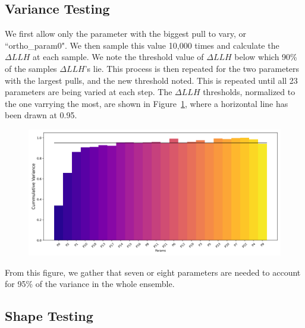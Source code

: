 \documentclass[12pt,a4paper]{article}
\begin{document}
\subsection{Variance Testing}

We first allow only the parameter with the biggest pull to vary, or ``ortho\_param0". 
We then sample this value 10,000 times and calculate the $\Delta LLH$ at each sample. 
We note the threshold value of $\Delta LLH$ below which 90\% of the samples $\Delta LLH$'s lie. 
This process is then repeated for the two parameters with the largest pulls, and the new threshold noted.
This is repeated until all 23 parameters are being varied at each step. 
The $\Delta LLH$ thresholds, normalized to the one varrying the most, are shown in Figure~\ref{fig:distr}, where a horizontal line has been drawn at 0.95. 
\begin{figure}\label{fig:distr}
    \centering
    \includegraphics[width=0.8\linewidth]{./figures/daemon_variance_cummulative.png}
\end{figure}
From this figure, we gather that seven or eight parameters are needed to account for 95\% of the variance in the whole ensemble. 

\subsection{Shape Testing}
\end{document}
